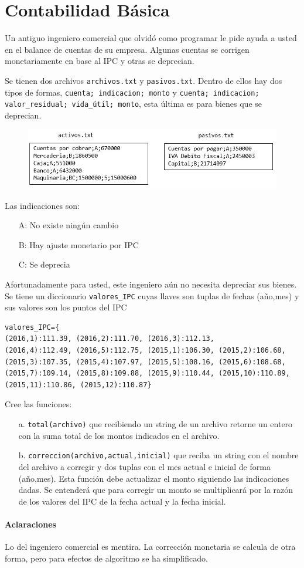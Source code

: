 \section{Contabilidad Básica}

Un antiguo ingeniero comercial que olvidó como programar le pide ayuda a usted en el balance de cuentas de su empresa. Algunas cuentas se corrigen monetariamente en base al IPC y otras se deprecian.

Se tienen dos archivos \texttt{archivos.txt} y \texttt{pasivos.txt}. Dentro de ellos hay dos tipos de formas, \texttt{cuenta; indicacion; monto} y \texttt{cuenta; indicacion; valor\_residual; vida\_útil; monto}, esta última es para bienes que se deprecian.

\begin{figure}[h]
    \centering
    \includegraphics{Imagenes/imagen1.jpg}
\end{figure}

Las indicaciones son:
\begin{itemize}
    \item[A:] No existe ningún cambio
    \item[B:] Hay ajuste monetario por IPC
    \item[C:] Se deprecia
\end{itemize}

Afortunadamente para usted, este ingeniero aún no necesita depreciar sus bienes. 
Se tiene un diccionario \texttt{valores\_IPC} cuyas llaves son tuplas de fechas (año,mes) y sus valores son los puntos del IPC

\begin{lstlisting}[style=consola]
valores_IPC={
(2016,1):111.39, (2016,2):111.70, (2016,3):112.13,
(2016,4):112.49, (2016,5):112.75, (2015,1):106.30, (2015,2):106.68,
(2015,3):107.35, (2015,4):107.97, (2015,5):108.16, (2015,6):108.68,
(2015,7):109.14, (2015,8):109.88, (2015,9):110.44, (2015,10):110.89,
(2015,11):110.86, (2015,12):110.87}
\end{lstlisting}

Cree las funciones:
\begin{itemize}
    \item[a.] \texttt{total(archivo)} que recibiendo un string de un archivo retorne un entero con la suma total de los montos indicados en el archivo.
    \item[b.] \texttt{correccion(archivo,actual,inicial)} que reciba un string con el nombre del archivo a corregir y dos tuplas con el mes actual e inicial de forma (año,mes). Esta función debe actualizar el monto siguiendo las indicaciones dadas. Se entenderá que para corregir un monto se multiplicará por la razón de los valores del IPC de la fecha actual y la fecha inicial.
\end{itemize}

\paragraph{Aclaraciones} Lo del ingeniero comercial es mentira. La corrección monetaria se calcula de otra forma, pero para efectos de algoritmo se ha simplificado.